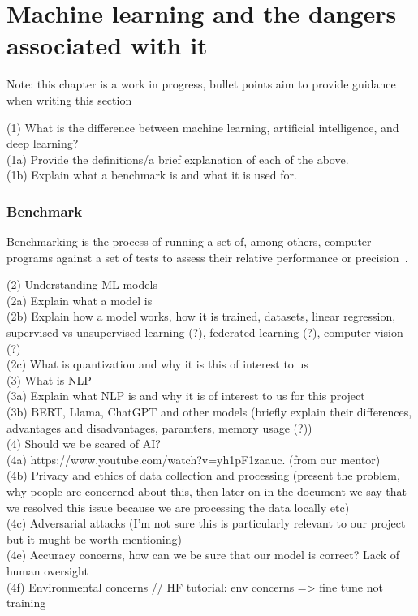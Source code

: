 \documentclass[licencjacka,en]{docs/pracamgr}
\begin{document}
\chapter{Machine learning and the dangers associated with it}
Note: this chapter is a work in progress, bullet points aim to provide guidance when writing this section

(1) What is the difference between machine learning, artificial intelligence, and deep learning? \\
(1a) Provide the definitions/a brief explanation of each of the above.\\
(1b) Explain what a benchmark is and what it is used for. \\

\subsection{Benchmark}
Benchmarking is the process of running a set of, among others, computer programs against a set of tests to assess their relative performance or precision~\cite{benchmark}.

(2) Understanding ML models \\
(2a) Explain what a model is \\
(2b) Explain how a model works, how it is trained, datasets, linear regression, supervised vs unsupervised learning (?), federated learning (?), computer vision (?) \\
(2c) What is quantization and why it is this of interest to us \\

(3) What is NLP \\
(3a) Explain what NLP is and why it is of interest to us for this project \\
(3b) BERT, Llama, ChatGPT and other models (briefly explain their differences, advantages and disadvantages, paramters, memory usage (?)) \\

(4) Should we be scared of AI? \\
(4a) https://www.youtube.com/watch?v=yh1pF1zaauc. (from our mentor) \\
(4b) Privacy and ethics of data collection and processing (present the problem, why people are concerned about this, then later on in the document we say that we resolved this issue because we are processing the data locally etc) \\
(4c) Adversarial attacks (I'm not sure this is particularly relevant to our project but it mught be worth mentioning) \\
(4e) Accuracy concerns, how can we be sure that our model is correct? Lack of human oversight \\
(4f) Environmental concerns
// HF tutorial: env concerns => fine tune not training 
\end{document}
